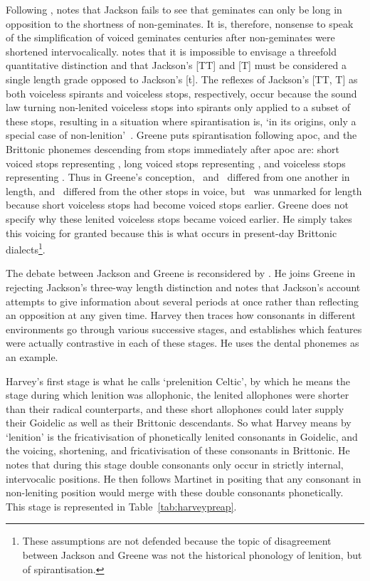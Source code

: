 Following \textcite{martinet_celtic_1952}, \textcite{greene_gemination_1956} notes that Jackson fails to see that geminates can only be long in opposition to the shortness of non-geminates. It is, therefore, nonsense to speak of the simplification of voiced geminates centuries after non-geminates were shortened intervocalically. \Textcite{Gre_Spirant66} notes that it is impossible to envisage a threefold quantitative distinction  and that Jackson's [TT] and [T] must be considered a single length grade opposed to Jackson's [t]. The  reflexes of Jackson's [TT, T] as both voiceless spirants and voiceless stops, respectively, occur because the sound law turning non-lenited voiceless stops into spirants  only applied to a subset of these stops, resulting in a situation where spirantisation is, `in its origins, only a special case of non-lenition'~\autocite[119]{Gre_Spirant66}. Greene puts spirantisation following \gls{apoc}, and the Brittonic \gls{phoneme}s descending from stops immediately after \gls{apoc} are: short voiced stops representing \lT, long voiced stops representing \xD, and voiceless stops representing \xT. Thus in Greene's conception, \lT\ and \xD\ differed from one another in length, and \xT\ differed from the other stops in voice, but \xT\ was unmarked for length because short voiceless stops had become voiced stops earlier. Greene does not specify why these lenited voiceless stops became voiced earlier. He simply takes this voicing for granted because this is what occurs in present-day Brittonic dialects\footnote{These assumptions are not defended because the topic of disagreement between Jackson and Greene was not the historical phonology of lenition, but of spirantisation.}.


The debate between Jackson and Greene is reconsidered by \textcite{harvey_aspects_1984}. He joins Greene in rejecting Jackson's three-way length distinction and notes that Jackson's account attempts to give information about several periods at once rather than reflecting an opposition at any given time. Harvey then traces how consonants in different environments go through various successive stages, and establishes which features were actually contrastive in each of these stages. He uses the dental \gls{phoneme}s as an example.

Harvey's first stage is what he calls `prelenition Celtic', by which he means the stage during which lenition was allophonic, the lenited allophones were shorter than their radical counterparts,  and these short allophones could later supply their Goidelic as well as their Brittonic descendants. So what Harvey means by `lenition' is the fricativisation of phonetically lenited consonants in Goidelic, and the voicing, shortening, and fricativisation of these consonants in Brittonic. He notes that during this stage double consonants only occur in strictly internal, intervocalic positions. He then follows Martinet in positing that any consonant in non-leniting position would merge with these double consonants phonetically. This stage is represented in Table~\ref{tab:harveypreap}.


